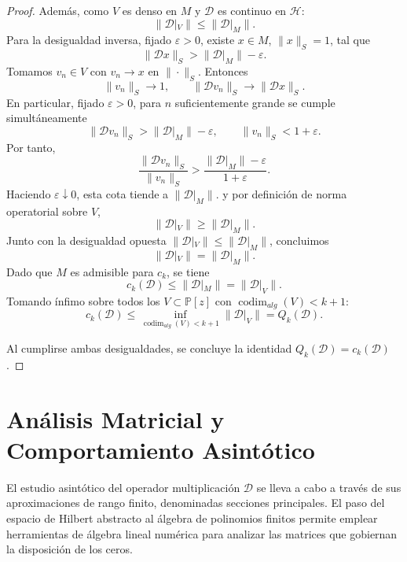 \documentclass[12pt,a4paper]{article}
\theoremstyle{definition}
\theoremstyle{remark}
\begin{document}
\begin{proof}
	Además, como $V$ es denso en $M$ y $\mathcal{D}$ es continuo en $\mathcal{H}$:
	\[
		\|\mathcal{D}|_V\|\le \|\mathcal{D}|_M\|.
	\]
	Para la desigualdad inversa, fijado $\varepsilon>0$, existe $x\in M$, $\|x\|_S=1$, tal que
	\[
		\|\mathcal{D}x\|_S>\|\mathcal{D}|_M\|-\varepsilon.
	\]
	Tomamos $v_n\in V$ con $v_n\to x$ en $\|\cdot\|_S$. Entonces
	\[
		\|v_n\|_S\to 1,
		\qquad
		\|\mathcal{D}v_n\|_S\to \|\mathcal{D}x\|_S.
	\]
	En particular, fijado $\varepsilon>0$, para $n$ suficientemente grande se cumple simultáneamente
	\[
		\|\mathcal D v_n\|_S>\|\mathcal D|_M\|-\varepsilon,
		\qquad
		\|v_n\|_S<1+\varepsilon.
	\]
	Por tanto,
	\[
		\frac{\|\mathcal{D}v_n\|_S}{\|v_n\|_S}
		>
		\frac{\|\mathcal D|_M\|-\varepsilon}{1+\varepsilon}.
	\]
	Haciendo $\varepsilon\downarrow 0$, esta cota tiende a $\|\mathcal D|_M\|$.
	y por definición de norma operatorial sobre $V$,
	\[
		\|\mathcal{D}|_V\|\ge \|\mathcal D|_M\|.
	\]
	Junto con la desigualdad opuesta $\|\mathcal D|_V\|\le \|\mathcal D|_M\|$, concluimos
	\[
		\|\mathcal{D}|_V\|=\|\mathcal{D}|_M\|.
	\]
	Dado que $M$ es admisible para $c_k$, se tiene
	\[
		c_k(\mathcal{D})\le \|\mathcal{D}|_M\|=\|\mathcal{D}|_V\|.
	\]
	Tomando ínfimo sobre todos los $V\subset\mathbb{P}[z]$ con $\operatorname{codim}_{alg}(V)<k+1$:
	\[
		c_k(\mathcal{D})\le \inf_{\operatorname{codim}_{alg}(V)<k+1}\|\mathcal{D}|_V\|=Q_k(\mathcal{D}).
	\]

	Al cumplirse ambas desigualdades, se concluye la identidad $Q_k(\mathcal{D}) = c_k(\mathcal{D})$.
\end{proof}

\section{Análisis Matricial y Comportamiento Asintótico}\label{sec:matricial}

El estudio asintótico del operador multiplicación $\mathcal{D}$ se lleva a cabo a través de sus aproximaciones de rango finito, denominadas secciones principales. El paso del espacio de Hilbert abstracto al álgebra de polinomios finitos permite emplear herramientas de álgebra lineal numérica para analizar las matrices que gobiernan la disposición de los ceros.
\end{document}

